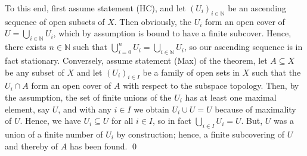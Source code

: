 \documentclass[12pt]{article}
\newcommand{\N}{\mathbb{N}}
\begin{document}
To this end, first assume statement (HC),
and let $(U_i)_{i \in \N}$ be an ascending sequence of open subsets of $X$.
Then obviously, the $U_i$ form an open cover of $U = \bigcup_{i \in \N} U_i$,
which by assumption is bound to have a finite subcover.
Hence, there exists $n \in \N$
such that $\bigcup_{i=0}^n U_i = \bigcup_{i \in \N} U_i$,
so our ascending sequence is in fact stationary.
Conversely, assume statement (Max) of the theorem,
let $A \subseteq X$ be any subset of $X$
and let $(U_i)_ {i \in I}$ be a family of open sets in $X$
such that the $U_i \cap A$ form an open cover of $A$
with respect to the subspace topology.
Then, by the assumption,
the set of finite unions of the $U_i$ has at least one maximal element,
say $U$,
and with any $i \in I$ we obtain $U_i \cup U = U$
because of maximality of $U$.
Hence, we have $U_i \subseteq U$  for all $i \in I$,
so in fact $\bigcup_{i \in I} U_i = U$.
But, $U$ was a union of a finite number of $U_i$ by construction;
hence, a finite subcovering of $U$ and thereby of $A$ has been found. \qed

\end{document}
